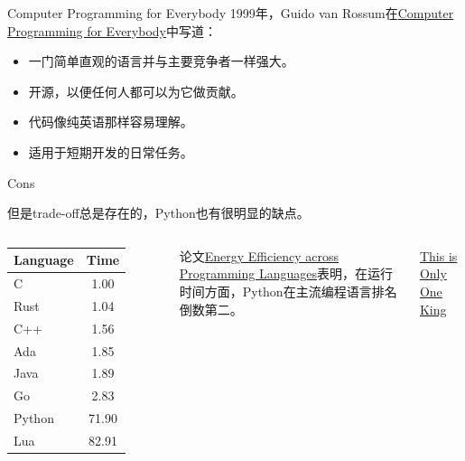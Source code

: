 \documentclass[aspectratio=169, 14pt]{beamer}
\begin{document}
\begin{frame}{Computer Programming for Everybody}
	1999年，Guido van Rossum在\href{https://www.python.org/doc/essays/cp4e/}{Computer Programming for Everybody}中写道：

	\begin{itemize}
		\item 一门简单直观的语言并与主要竞争者一样强大。
		\item 开源，以便任何人都可以为它做贡献。
		\item  代码像纯英语那样容易理解。
		\item 适用于短期开发的日常任务。
	\end{itemize}

\end{frame}

\begin{frame}
	\begin{exampleblock}{Cons}

		但是\alert{trade-off}总是存在的，Python也有很明显的缺点。
	\end{exampleblock}

	\begin{columns}
		\begin{tabular}{l c}
			\hline
			\textbf{Language} & \textbf{Time} \\
			\hline
			C                 & 1.00          \\
			Rust              & 1.04          \\
			C++               & 1.56          \\
			Ada               & 1.85          \\
			Java              & 1.89          \\
			Go                & 2.83          \\
			Python            & 71.90         \\
			Lua               & 82.91         \\
			\hline
		\end{tabular}
		论文\href{https://greenlab.di.uminho.pt/wp-content/uploads/2017/09/paperSLE.pdf}{Energy Efficiency across Programming Languages}表明，在运行时间方面，Python在主流编程语言排名\alert{倒数第二}。

		\href{https://www.reddit.com/r/ProgrammerHumor/comments/m3pf9h/there_is_only_one_king/}{This is Only One King}

	\end{columns}
\end{frame}
\end{document}
